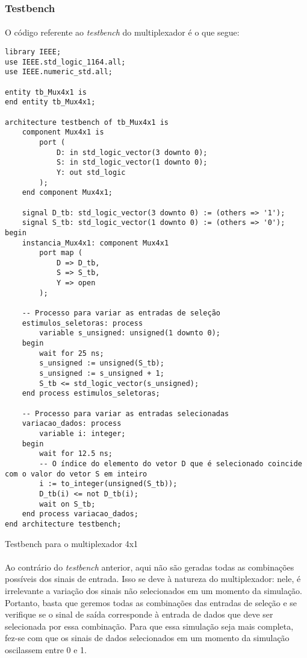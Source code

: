 \documentclass[a4paper,12pt]{article}
\newenvironment{code}{\captionsetup{type=listing}}{}
\begin{document}
\subsubsection{Testbench}
\paragraph{}
O código referente ao \textit{testbench} do multiplexador é o que segue:

\begin{code}
\begin{verbatim}
library IEEE;
use IEEE.std_logic_1164.all;
use IEEE.numeric_std.all;

entity tb_Mux4x1 is
end entity tb_Mux4x1;

architecture testbench of tb_Mux4x1 is
    component Mux4x1 is
        port (
            D: in std_logic_vector(3 downto 0);
            S: in std_logic_vector(1 downto 0);
            Y: out std_logic
        );
    end component Mux4x1;
    
    signal D_tb: std_logic_vector(3 downto 0) := (others => '1');
    signal S_tb: std_logic_vector(1 downto 0) := (others => '0');
begin
    instancia_Mux4x1: component Mux4x1
        port map (
            D => D_tb,
            S => S_tb,
            Y => open
        );

    -- Processo para variar as entradas de seleção
    estimulos_seletoras: process
        variable s_unsigned: unsigned(1 downto 0);
    begin
        wait for 25 ns;
        s_unsigned := unsigned(S_tb);
        s_unsigned := s_unsigned + 1;
        S_tb <= std_logic_vector(s_unsigned);
    end process estimulos_seletoras;
    
    -- Processo para variar as entradas selecionadas
    variacao_dados: process
        variable i: integer;
    begin
        wait for 12.5 ns;
        -- O índice do elemento do vetor D que é selecionado coincide com o valor do vetor S em inteiro
        i := to_integer(unsigned(S_tb));
        D_tb(i) <= not D_tb(i);
        wait on S_tb;
    end process variacao_dados;
end architecture testbench;
\end{verbatim}
\caption{Testbench para o multiplexador 4x1}
\end{code}

\paragraph{}
Ao contrário do \textit{testbench} anterior, aqui não são geradas todas as combinações possíveis dos sinais de entrada. Isso se deve à natureza do multiplexador: nele, é irrelevante a variação dos sinais não selecionados em um momento da simulação. Portanto, basta que geremos todas as combinações das entradas de seleção e se verifique se o sinal de saída corresponde à entrada de dados que deve ser selecionada por essa combinação. Para que essa simulação seja mais completa, fez-se com que os sinais de dados selecionados em um momento da simulação oscilassem entre 0 e 1.
\end{document}
